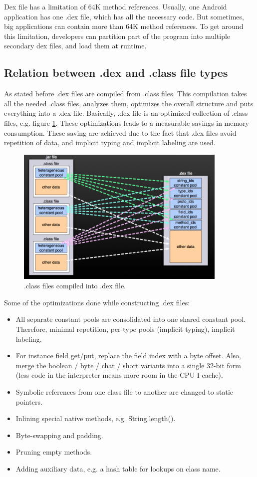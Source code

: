 \documentclass[11pt, oneside]{article}   	%
\begin{document}
Dex file has a limitation of 64K method references. Usually, one Android application has one .dex file, which has all the necessary code. 
But sometimes, big applications can contain more than 64K method references. To get around this limitation, developers can partition part of the program into multiple secondary dex files, and load them at runtime.

\subsection{Relation between .dex and .class file types}

As stated before .dex files are compiled from .class files. This compilation takes all the needed .class files, analyzes them, optimizes the overall structure and puts everything into a .dex file. Basically, .dex file is an optimized collection of .class files, e.g. figure \ref{fig:class_dex}. These optimizations leads to a measurable savings in memory consumption. These saving are achieved due to the fact that .dex files avoid repetition of data, and implicit typing and implicit labeling are used.
\begin{figure}
  \center
  \includegraphics[width=0.9\textwidth]{./images/class_dex.png}
  \caption{.class files compiled into .dex file.}
  \label{fig:class_dex}
\end{figure}

Some of the optimizations done while constructing .dex files:
\begin{itemize}
 \itemsep0pt
 \item All separate constant pools are consolidated into one shared constant pool. Therefore, minimal repetition, per-type pools (implicit typing), implicit labeling.
 \item For instance field get/put, replace the field index with a byte offset. Also, merge the boolean / byte / char / short variants into a single 32-bit form (less code in the interpreter means more room in the CPU I-cache).
 \item Symbolic references from one class file to another are changed to static pointers.
 \item Inlining special native methods, e.g. String.length().
 \item Byte-swapping and padding.
 \item Pruning empty methods.
 \item Adding auxiliary data, e.g. a hash table for lookups on class name.
\end{itemize}
\end{document}
